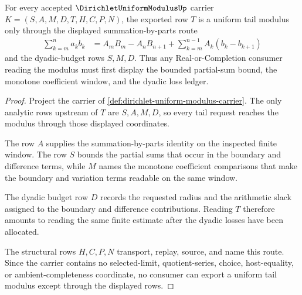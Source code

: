 \begin{theorem}
\label{thm:dirichlet-uniform-modulus-tail-budget}
For every accepted $\DirichletUniformModulusUp$ carrier $K=(S,A,M,D,T,H,C,P,N)$, the exported row $T$ is a uniform tail modulus only through the displayed summation-by-parts route
$$
\begin{aligned}
\sum_{k=m}^{n} a_k b_k
  &= A_m B_m - A_n B_{n+1}
     + \sum_{k=m}^{n-1} A_k(b_k-b_{k+1})
\end{aligned}
$$
and the dyadic-budget rows $S,M,D$. Thus any Real-or-Completion consumer reading the modulus must first display the bounded partial-sum bound, the monotone coefficient window, and the dyadic loss ledger.
\end{theorem}
\begin{proof}
Project the carrier of \autoref{def:dirichlet-uniform-modulus-carrier}. The only analytic rows upstream of $T$ are $S,A,M,D$, so every tail request reaches the modulus through those displayed coordinates.

The row $A$ supplies the summation-by-parts identity on the inspected finite window. The row $S$ bounds the partial sums that occur in the boundary and difference terms, while $M$ names the monotone coefficient comparisons that make the boundary and variation terms readable on the same window.

The dyadic budget row $D$ records the requested radius and the arithmetic slack assigned to the boundary and difference contributions. Reading $T$ therefore amounts to reading the same finite estimate after the dyadic losses have been allocated.

The structural rows $H,C,P,N$ transport, replay, source, and name this route. Since the carrier contains no selected-limit, quotient-series, choice, host-equality, or ambient-completeness coordinate, no consumer can export a uniform tail modulus except through the displayed rows.
\end{proof}

